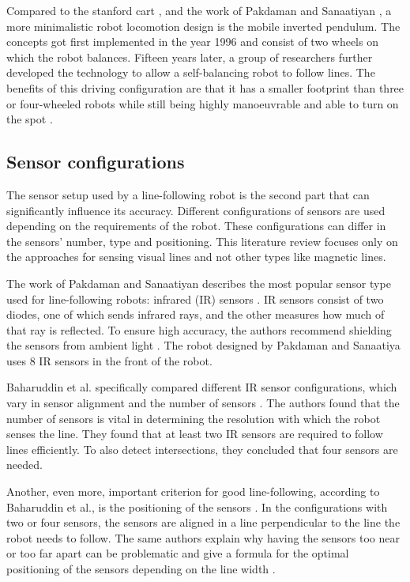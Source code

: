 Compared to the stanford cart \cite{moravec}, and the work of Pakdaman and Sanaatiyan \cite{pakdaman}, a more minimalistic robot locomotion design is the mobile inverted pendulum. The concepts got first implemented in the year 1996 \cite{yun-su} and consist of two wheels on which the robot balances. Fifteen years later, a group of researchers \cite{ghani} further developed the technology to allow a self-balancing robot to follow lines. The benefits of this driving configuration are that it has a smaller footprint than three or four-wheeled robots while still being highly manoeuvrable and able to turn on the spot \cite{coelho}.

\subsection{Sensor configurations}
The sensor setup used by a line-following robot is the second part that can significantly influence its accuracy. Different configurations of sensors are used depending on the requirements of the robot. These configurations can differ in the sensors' number, type and positioning. This literature review focuses only on the approaches for sensing visual lines and not other types like magnetic lines.

The work of Pakdaman and Sanaatiyan describes the most popular sensor type used for line-following robots: infrared (IR) sensors \cite{pakdaman}. IR sensors consist of two diodes, one of which sends infrared rays, and the other measures how much of that ray is reflected. To ensure high accuracy, the authors recommend shielding the sensors from ambient light \cite{pakdaman}. The robot designed by Pakdaman and Sanaatiya uses 8 IR sensors in the front of the robot.

Baharuddin et al.  specifically compared different IR sensor configurations, which vary in sensor alignment and the number of sensors \cite{baharuddin}. The authors found that the number of sensors is vital in determining the resolution with which the robot senses the line. They found that at least two IR sensors are required to follow lines efficiently. To also detect intersections, they concluded that four sensors are needed. 

Another, even more, important criterion for good line-following, according to Baharuddin et al., is the positioning of the sensors \cite{baharuddin}. In the configurations with two or four sensors, the sensors are aligned in a line perpendicular to the line the robot needs to follow. The same authors explain why having the sensors too near or too far apart can be problematic and give a formula for the optimal positioning of the sensors depending on the line width \cite{baharuddin}.

